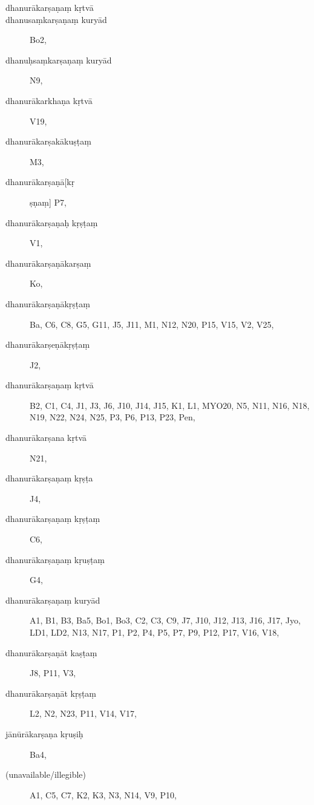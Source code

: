 \begin{ekdosis}
\begin{marma}[hp01_025]


  \begin{description}
\item[dhanurākarṣaṇaṃ kṛtvā]
\item[dhanusaṃkarṣaṇaṃ kuryād] Bo2,
\item[dhanuḥsaṃkarṣaṇaṃ kuryād] N9,
\item[dhanurākarkhaṇa kṛtvā] V19,
\item[dhanurākarṣakākuṣṭaṃ] M3,
\item[dhanurākarṣaṇā[kṛ]ṣṇaṃ] P7,
\item[dhanurākarṣaṇaḥ kṛṣṭaṃ] V1,
\item[dhanurākarṣaṇākarṣaṃ] Ko,
\item[dhanurākarṣaṇākṛṣṭaṃ] Ba, C6, C8, G5, G11, J5, J11, M1, N12, N20, P15, V15, V2, V25, 
\item[dhanurākarṣeṇākṛṣṭaṃ] J2,
\item[dhanurākarṣaṇaṃ kṛtvā] B2, C1, C4, J1, J3, J6, J10, J14, J15, K1, L1, MYO20, N5, N11, N16, N18, N19, N22, N24, N25, P3, P6, P13, P23, Pen,
\item[dhanurākarṣana kṛtvā] N21,
\item[dhanurākarṣaṇaṃ kṛṣṭa] J4,
\item[dhanurākarṣaṇaṃ kṛṣṭaṃ] C6,
\item[dhanurākarṣaṇaṃ kṛuṣṭaṃ] G4,
\item[dhanurākarṣaṇaṃ kuryād] A1, B1, B3, Ba5, Bo1, Bo3, C2, C3, C9, J7, J10, J12, J13, J16, J17, Jyo, LD1, LD2, N13, N17, P1, P2, P4, P5, P7, P9, P12, P17, V16, V18, 
\item[dhanurākarṣaṇāt kaṣṭaṃ] J8, P11, V3, 
\item[dhanurākarṣaṇāt kṛṣṭaṃ] L2, N2, N23, P11, V14, V17, 
\item[jānūrākarṣaṇa kṛuṣiḥ] Ba4, 
\item[(unavailable/illegible)] A1, C5, C7, K2, K3, N3, N14, V9, P10, 
\end{description}
 \end{marma}


\begin{marma}[hp01_027]



\end{marma}
\end{ekdosis}
